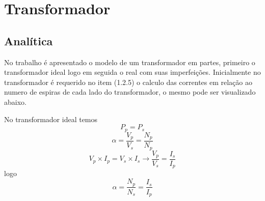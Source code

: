 \documentclass[
	12pt,				%
	openright,			%
	twoside,			%
	a4paper,			%
	english,			%
	french,				%
	spanish,			%
	brazil,				%
	]{abntex2}
\begin{document}

\frenchspacing 


\imprimircapa






\listoffigures*
\newpage

\listoftables*
\cleardoublepage



\tableofcontents*
\cleardoublepage


\textual

\chapter[Transformador]{Transformador}

\section{Analítica}

No trabalho é apresentado o modelo de um transformador em partes, primeiro o transformador ideal logo em seguida o real com suas imperfeições. Inicialmente no transformador é requerido no item (1.2.5) o calculo das correntes em relação ao numero de espiras de cada lado do transformador, o mesmo pode ser visualizado abaixo.

No transformador ideal temos
$$P_{p} = P_{s}$$
$$\alpha = \frac{V_{p}}{V_{s}} = \frac{N_{p}}{N_{p}}$$
$$V_{p} \times I_{p} = V_{s} \times I_{s} \rightarrow \frac{V_{p}}{V_{s}} = \frac{I_{s}}{I_{p}}$$
logo
$$\alpha = \frac{N_{p}}{N_{s}} = \frac{I_{s}}{I_{p}}$$
\end{document}
